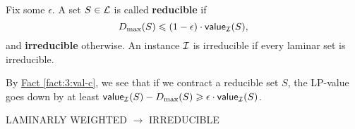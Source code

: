 \documentclass[./main.tex]{subfiles}
\begin{document}
	\begin{definition}
		Fix some $\epsilon$. A set $S\in \mathcal{L}$ is called \textbf{reducible} if
		\[
			D_{\max}(S) \leqslant (1 - \epsilon)\cdot \textsf{\textup{value}}_{\mathcal{I}}(S),
		\]
		and \textbf{irreducible} otherwise.
		An instance $\mathcal{I}$ is irreducible if every laminar set is irreducible.
	\end{definition}

	By \hyperref[fact:3:val-c]{Fact \ref{fact:3:val-c}}, we see that if we contract a reducible set $S$, the LP-value goes down by at least $\textsf{\textup{value}}_{\mathcal{I}}(S) - D_{\max}(S) \geqslant \epsilon\cdot \textsf{\textup{value}}_{\mathcal{I}}(S)$.\\

	\begin{algorithm}[H]\label{alg:1}
		\caption{LAMINARLY WEIGHTED $\rightarrow$ IRREDUCIBLE}
	\end{algorithm}\vspace{2mm}
\end{document}
